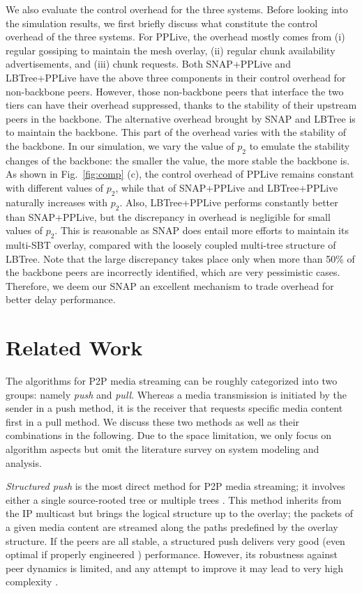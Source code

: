 \documentclass[conference]{IEEEtran}
\begin{document}
  We also evaluate the control overhead for the three systems. Before looking into the simulation results, we first briefly discuss what constitute the control overhead of the three systems. For PPLive, the overhead mostly comes from (i) regular gossiping to maintain the mesh overlay, (ii) regular chunk availability advertisements, and (iii) chunk requests. Both SNAP+PPLive and LBTree+PPLive have the above three components in their control overhead for non-backbone peers. However, those non-backbone peers that interface the two tiers can have their overhead suppressed, thanks to the stability of their upstream peers in the backbone. The alternative overhead brought by SNAP and LBTree is to maintain the backbone. This part of the overhead varies with the stability of the backbone. In our simulation, we vary the value of $p_2$ to emulate the stability changes of the backbone: the smaller the value, the more stable the backbone is. As shown in Fig.~\ref{fig:comp} (c), the control overhead of PPLive remains constant with different values of $p_2$, while that of SNAP+PPLive and LBTree+PPLive naturally increases with $p_2$. Also, LBTree+PPLive performs constantly better than SNAP+PPLive, but the discrepancy in overhead is negligible for small values of $p_2$. This is reasonable as SNAP does entail more efforts to maintain its multi-SBT overlay, compared with the loosely coupled multi-tree structure of LBTree. Note that the large discrepancy takes place only when more than 50\% of the backbone peers are incorrectly identified, which are very pessimistic cases. Therefore, we deem our SNAP an excellent mechanism to trade overhead for better delay performance.

\section{Related Work} \label{sec:rw}
The algorithms for P2P media streaming can be roughly categorized into two groups: namely \textit{push} and \textit{pull}. Whereas a media transmission is initiated by the sender in a push method, it is the receiver that requests specific media content first in a pull method. We discuss these two methods as well as their combinations in the following. Due to the space limitation, we only focus on algorithm aspects but omit the literature survey on system modeling and analysis.

  \textit{Structured push} is the most direct method for P2P media streaming; it involves either a single source-rooted tree \cite{ChuRZ-SIGMETRICS00,BanerjeeBK-SIGCOMM02} or multiple trees \cite{CastroDKNRS-SOSP03,VenkataramanYF-ICNP06,LiuSJRC-SIGMETRICS08}. This method inherits from the IP multicast \cite{DeeringC-TCS90} but brings the logical structure up to the overlay; the packets of a given media content are streamed along the paths predefined by the overlay structure. If the peers are all stable, a structured push delivers very good (even optimal if properly engineered \cite{LiuSJRC-SIGMETRICS08}) performance. However, its robustness against peer dynamics is limited, and any attempt to improve it may lead to very high complexity \cite{MaghareiRG-INFOCOM07}.
\end{document}
